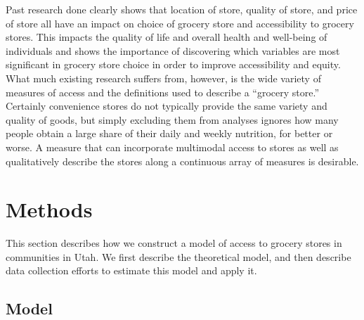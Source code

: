 \documentclass[
  letterpaper,
  DIV=11,
  numbers=noendperiod]{scrreport}
\begin{document}
Past research done clearly shows that location of store, quality of
store, and price of store all have an impact on choice of grocery store
and accessibility to grocery stores. This impacts the quality of life
and overall health and well-being of individuals and shows the
importance of discovering which variables are most significant in
grocery store choice in order to improve accessibility and equity. What
much existing research suffers from, however, is the wide variety of
measures of access and the definitions used to describe a ``grocery
store.'' Certainly convenience stores do not typically provide the same
variety and quality of goods, but simply excluding them from analyses
ignores how many people obtain a large share of their daily and weekly
nutrition, for better or worse. A measure that can incorporate
multimodal access to stores as well as qualitatively describe the stores
along a continuous array of measures is desirable.


\hypertarget{sec-methods}{%
\chapter{Methods}\label{sec-methods}}

This section describes how we construct a model of access to grocery
stores in communities in Utah. We first describe the theoretical model,
and then describe data collection efforts to estimate this model and
apply it.

\hypertarget{model}{%
\section{Model}\label{model}}
\end{document}
